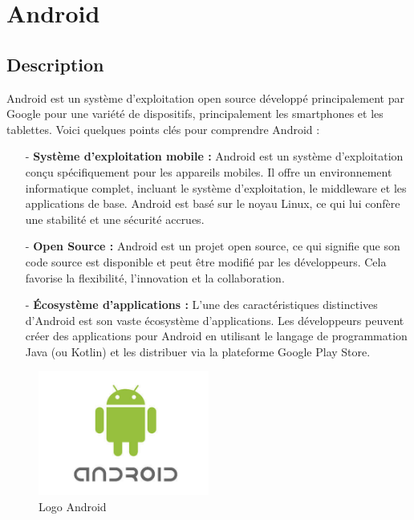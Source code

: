 \chapter{Android}
	\minitoc
	\newpage
\section{Description}
Android est un système d'exploitation open source développé principalement par Google pour une variété de dispositifs, principalement les smartphones et les tablettes. Voici quelques points clés pour comprendre Android :
\begin{itemize}
\item[-]\textbf{Système d'exploitation mobile :} Android est un système d'exploitation conçu spécifiquement pour les appareils mobiles. Il offre un environnement informatique complet, incluant le système d'exploitation, le middleware et les applications de base. Android est basé sur le noyau Linux, ce qui lui confère une stabilité et une sécurité accrues.
\item[-]\textbf{Open Source :} Android est un projet open source, ce qui signifie que son code source est disponible et peut être modifié par les développeurs. Cela favorise la flexibilité, l'innovation et la collaboration. 
\item[-]\textbf{Écosystème d'applications :} L'une des caractéristiques distinctives d'Android est son vaste écosystème d'applications. Les développeurs peuvent créer des applications pour Android en utilisant le langage de programmation Java (ou Kotlin) et les distribuer via la plateforme Google Play Store.
\end{itemize}
	\begin{figure}[!h]
    	\center
    		\includegraphics[width=0.5\textwidth]{image/android_logo.jpg}
   		\caption{Logo Android}
    	\label{Logo Android}
	\end{figure}

